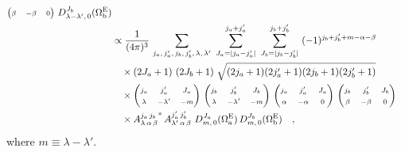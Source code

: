 \begin{subequations}
\begin{align}
\begin{pmatrix}
             \mss{\beta} & \mss{-\beta} & \mss{0}
           \end{pmatrix}\,
           D_{\lambda-\lambda',\,0}^{J_b}(\EulSet[b])
           \\ \label{eq:ampSqLast}
        &\propto \frac{1}{(4\pi)^3}\,
           \sum_{j_a,\,j_a',\,j_b,\,j_b',\,\lambda,\,\lambda'}\
           \sum_{J_a=|j_a-j_a'|}^{j_a+j_a'}\
           \sum_{J_b=|j_b-j_b'|}^{j_b+j_b'}\
           (-1)^{j_b+j_b'+m-\alpha-\beta}
           \nonumber\\&\quad\times
           \left(2J_a+1\right)\, \left(2J_b+1\right)\, \sqrt{(2j_a+1)(2j_a'+1)(2j_b+1)(2j_b'+1)}
           \nonumber\\&\quad\times
           \begin{pmatrix}
             \mss{j_a} & \mss{j_a'} & \mss{J_a}\\
             \mss{\lambda} & \mss{-\lambda'} & \mss{-m}
           \end{pmatrix}\,
           \begin{pmatrix}
             \mss{j_b} & \mss{j_b'} & \mss{J_b} \\
             \mss{\lambda} & \mss{-\lambda'} & \mss{-m}
           \end{pmatrix}\,
           \begin{pmatrix}
             \mss{j_a} & \mss{j_a'} & \mss{J_a}\\
             \mss{\alpha} & \mss{-\alpha} & \mss{0}
           \end{pmatrix}\,
           \begin{pmatrix}
             \mss{j_b} & \mss{j_b'} & \mss{J_b}\\
             \mss{\beta} & \mss{-\beta} & \mss{0}
           \end{pmatrix}
           \nonumber\\&\quad\times
           {A_{\lambda\,\alpha\,\beta}^{j_a\,j_b}}^*\, A_{\lambda'\,\alpha\,\beta}^{j_a'\,j_b'}\
           D_{m,\,0}^{J_a}(\EulSet[a])\, D_{m,\,0}^{J_b}(\EulSet[b])
  \quad,
\end{align}\end{subequations}
where $m\equiv\lambda-\lambda'$.

